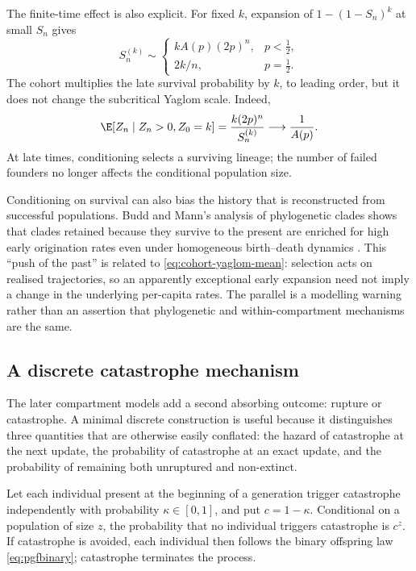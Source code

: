 The finite-time effect is also explicit.  For fixed \(k\), expansion of
\(1-(1-S_n)^k\) at small \(S_n\) gives
\begin{equation}
  S_n^{(k)}\sim
  \begin{cases}
    kA(p)(2p)^n,&p<\tfrac12,\\[3pt]
    2k/n,&p=\tfrac12.
  \end{cases}
  \label{eq:cohort-late-asymptotics}
\end{equation}
The cohort multiplies the late survival probability by \(k\), to leading order,
but it does not change the subcritical Yaglom scale.  Indeed,
\begin{equation}
  \E[Z_n\mid Z_n>0,Z_0=k]
  =\frac{k(2p)^n}{S_n^{(k)}}
  \longrightarrow\frac1{A(p)}.
  \label{eq:cohort-yaglom-mean}
\end{equation}
At late times, conditioning selects a surviving lineage; the number of failed
founders no longer affects the conditional population size.

Conditioning on survival can also bias the history that is reconstructed from
successful populations.  Budd and Mann's analysis of phylogenetic clades shows
that clades retained because they survive to the present are enriched for high
early origination rates even under homogeneous birth--death dynamics
\cite{Budd2018}.  This ``push of the past'' is related to
\eqref{eq:cohort-yaglom-mean}: selection acts on realised trajectories, so an
apparently exceptional early expansion need not imply a change in the underlying
per-capita rates.  The parallel is a modelling warning rather than an assertion
that phylogenetic and within-compartment mechanisms are the same.

\subsection{A discrete catastrophe mechanism}
\label{sec:bdc}

The later compartment models add a second absorbing outcome: rupture or
catastrophe.  A minimal discrete construction is useful because it distinguishes
three quantities that are otherwise easily conflated: the hazard of catastrophe
at the next update, the probability of catastrophe at an exact update, and the
probability of remaining both unruptured and non-extinct.

Let each individual present at the beginning of a generation trigger catastrophe
independently with probability \(\kappa\in[0,1]\), and put
\(c=1-\kappa\).  Conditional on a population of size \(z\), the probability that
no individual triggers catastrophe is \(c^z\).  If catastrophe is avoided, each
individual then follows the binary offspring law \eqref{eq:pgfbinary}; catastrophe
terminates the process.

